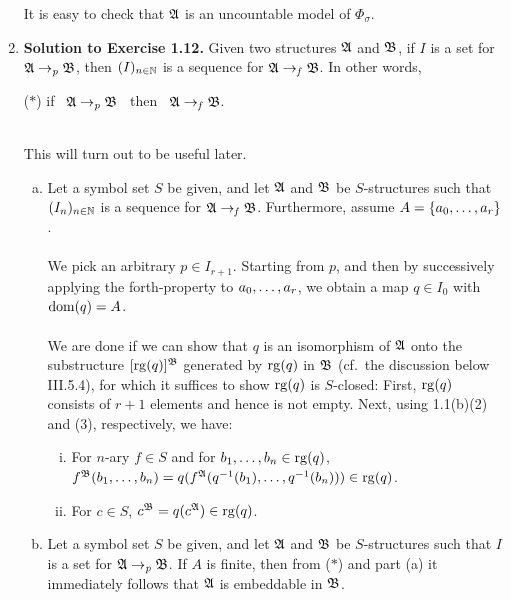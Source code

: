 \begin{enumerate}[1.]
\begin{medcenter}
\begin{tabular}{llll}
\end{tabular}
\end{medcenter}
It is easy to check that $\struct{A}$ is an uncountable model of $\Phi_\sigma$.
%
\item \textbf{Solution to Exercise 1.12.} Given two structures $\struct{A}$ and $\struct{B}$, if $I$ is a set for $\struct{A} \partemb \struct{B}$, then $(I)_{n \in \nat}$ is a sequence for $\struct{A} \finemb \struct{B}$. In other words,\smallskip\\
\begin{quoteno}{($\ast$)}
if \ $\struct{A} \partemb \struct{B}$ \ then \ $\struct{A} \finemb \struct{B}$.
\end{quoteno}\smallskip\\
This will turn out to be useful later.
\begin{enumerate}[(a)]
\item Let a symbol set $S$ be given, and let $\struct{A}$ and $\struct{B}$ be $S$-structures such that $(I_n)_{n \in \nat}$ is a sequence for $\struct{A} \finemb \struct{B}$. Furthermore, assume $A = \{\seq{a}{r}\}$.\\
\ \\
We pick an arbitrary $p \in I_{r + 1}$. Starting from $p$, and then by successively applying the forth-property to $\seq{a}{r}$, we obtain a map $q \in I_0$ with $\dom{q} = A$.\\
\ \\
We are done if we can show that $q$ is an isomorphism of $\struct{A}$ onto the substructure $[\rg{q}]^\struct{B}$ generated by $\rg{q}$ in $\struct{B}$ (cf.\ the discussion below III.5.4), for which it suffices to show $\rg{q}$ is $S$-closed: First, $\rg{q}$ consists of $r + 1$ elements and hence is not empty. Next, using 1.1(b)(2) and (3), respectively, we have:
\begin{enumerate}[(i)]
\item For $n$-ary $f \in S$ and for $\seq[1]{b}{n} \in \rg{q}$, $f^\struct{B} (\seq[1]{b}{n}) = q(f^\struct{A} (\seqp{q^{-1}(b_1)}{q^{-1}(b_n)})) \in \rg{q}$.
\item For $c \in S$, $c^\struct{B} = q(c^\struct{A}) \in \rg{q}$.
\end{enumerate}
\item Let a symbol set $S$ be given, and let $\struct{A}$ and $\struct{B}$ be $S$-structures such that $I$ is a set for $\struct{A} \partemb \struct{B}$. If $A$ is finite, then from ($\ast$) and part (a) it immediately follows that $\struct{A}$ is embeddable in $\struct{B}$.\\

\end{enumerate}
\end{enumerate}

